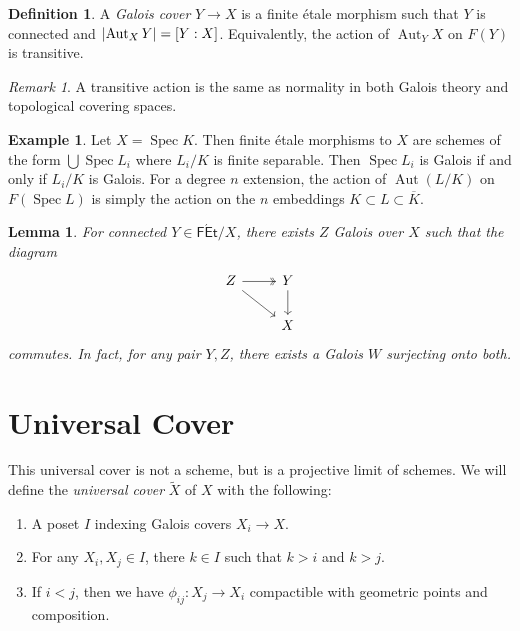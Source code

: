 \documentclass[leqno, openany]{memoir}
\newtheorem{lem}[thm]{Lemma}
\theoremstyle{definition}
\newtheorem{defn}[thm]{Definition}
\newtheorem{exm}[thm]{Example}
\theoremstyle{remark}
\newtheorem{rmk}[thm]{Remark}
\theoremstyle{plain}
\theoremstyle{definition}
\theoremstyle{remark}
\newcommand{\ms}[1]{\mathsf{#1}}
\newcommand{\ol}[1]{\overline{#1}}
\newcommand{\wt}[1]{\widetilde{#1}}
\DeclareMathOperator{\Aut}{Aut}
\DeclareMathOperator{\Spec}{Spec}
\begin{document}
\begin{defn} A \textit{Galois cover} $Y \to X$ is a finite \'etale morphism
such that $Y$ is connected and $\abs{\Aut_X Y} = [Y:X]$. Equivalently, the
action of $\Aut_Y X$ on $F(Y)$ is transitive.  \end{defn}

\begin{rmk} A transitive action is the same as normality in both Galois theory
and topological covering spaces.  \end{rmk}

\begin{exm} Let $X = \Spec K$. Then finite \'etale morphisms to $X$ are schemes
    of the form $\bigcup \Spec L_i$ where $L_i/K$ is finite separable. Then
    $\Spec L_i$ is Galois if and only if $L_i / K$ is Galois. For a degree $n$
    extension, the action of $\Aut(L/K)$ on $F(\Spec L)$ is simply the action
    on the $n$ embeddings $K \subset L \subset \ol{K}$.  \end{exm}

\begin{lem} For connected $Y \in \ms{F\acute{E}t}/X$, there exists $Z$ Galois
    over $X$ such that the diagram \begin{equation*} \begin{tikzcd} Z
    \arrow[twoheadrightarrow]{r}  \arrow{dr} & Y \arrow{d} \\ & X \end{tikzcd}
\end{equation*} commutes. In fact, for any pair $Y,Z$, there exists a Galois
$W$ surjecting onto both.  \end{lem}

\section{Universal Cover}%

This universal cover is not a scheme, but is a projective limit of schemes. We
will define the \textit{universal cover} $\wt{X}$ of $X$ with the following:
\begin{enumerate} \item A poset $I$ indexing Galois covers $X_i \to X$.  \item
    For any $X_i, X_j \in I$, there $k \in I$ such that $k > i$ and $k > j$.
    \item If $i < j$, then we have $\phi_{ij} \colon X_j \to X_i$ compactible
with geometric points and composition.  \end{enumerate}
\end{document}
